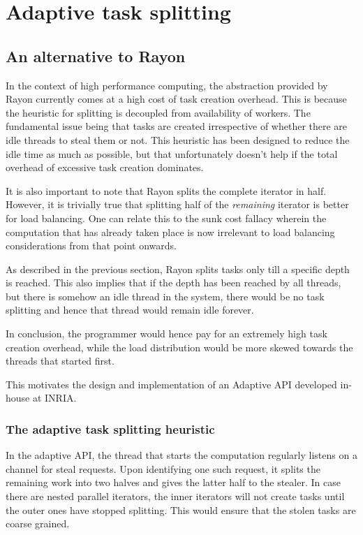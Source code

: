 
\chapter{Adaptive task splitting} %

\label{Chapter3} %


\section{An alternative to Rayon}
In the context of high performance computing, the abstraction provided by Rayon currently comes at a high cost of task creation overhead. This is because the heuristic for splitting is decoupled from availability of workers. The fundamental issue being that tasks are created irrespective of whether there are idle threads to steal them or not. This heuristic has been designed to reduce the idle time as much as possible, but that unfortunately doesn't help if the total overhead of excessive task creation dominates.

It is also important to note that Rayon splits the complete iterator in half. However, it is trivially true that splitting half of the \emph{remaining} iterator is better for load balancing. One can relate this to the sunk cost fallacy wherein the computation that has already taken place is now irrelevant to load balancing considerations from that point onwards.

As described in the previous section, Rayon splits tasks only till a specific depth is reached. This also implies that if the depth has been reached by all threads, but there is somehow an idle thread in the system, there would be no task splitting and hence that thread would remain idle forever.

In conclusion, the programmer would hence pay for an extremely high task creation overhead, while the load distribution would be more skewed towards the threads that started first.

This motivates the design and implementation of an Adaptive API developed in-house at INRIA.

\subsection{The adaptive task splitting heuristic}
In the adaptive API, the thread that starts the computation regularly listens on a channel for steal requests. Upon identifying one such request, it splits the remaining work into two halves and gives the latter half to the stealer. In case there are nested parallel iterators, the inner iterators will not create tasks until the outer ones have stopped splitting. This would ensure that the stolen tasks are coarse grained.

